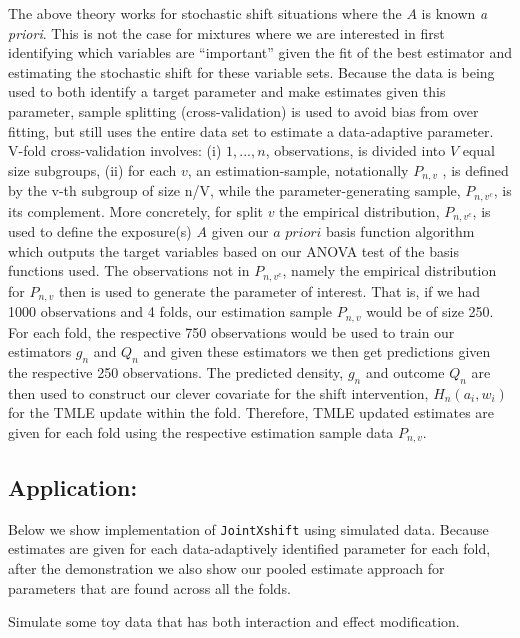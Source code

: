 \documentclass[
]{article}
\begin{document}
The above theory works for stochastic shift situations where the \(A\)
is known \textit{a priori}. This is not the case for mixtures where we
are interested in first identifying which variables are ``important''
given the fit of the best estimator and estimating the stochastic shift
for these variable sets. Because the data is being used to both identify
a target parameter and make estimates given this parameter, sample
splitting (cross-validation) is used to avoid bias from over fitting,
but still uses the entire data set to estimate a data-adaptive
parameter. V-fold cross-validation involves: (i) \({1,..., n}\),
observations, is divided into \(V\) equal size subgroups, (ii) for each
\(v\), an estimation-sample, notationally \(P_{n,v}\) , is defined by
the v-th subgroup of size n/V, while the parameter-generating sample,
\(P_{n,v^c}\), is its complement. More concretely, for split \(v\) the
empirical distribution, \(P_{n,v^c}\), is used to define the exposure(s)
\(A\) given our \(\textit{a priori}\) basis function algorithm which
outputs the target variables based on our ANOVA test of the basis
functions used. The observations not in \(P_{n,v^c}\), namely the
empirical distribution for \(P_{n,v}\) then is used to generate the
parameter of interest. That is, if we had 1000 observations and 4 folds,
our estimation sample \(P_{n,v}\) would be of size 250. For each fold,
the respective 750 observations would be used to train our estimators
\(g_n\) and \(Q_n\) and given these estimators we then get predictions
given the respective 250 observations. The predicted density, \(g_n\)
and outcome \(Q_n\) are then used to construct our clever covariate for
the shift intervention, \(H_n(a_i, w_i)\) for the TMLE update within the
fold. Therefore, TMLE updated estimates are given for each fold using
the respective estimation sample data \(P_{n,v}\).

\hypertarget{application}{%
\subsection{Application:}\label{application}}

Below we show implementation of \texttt{JointXshift} using simulated data.
Because estimates are given for each data-adaptively identified
parameter for each fold, after the demonstration we also show our pooled
estimate approach for parameters that are found across all the folds.

Simulate some toy data that has both interaction and effect
modification.
\end{document}
